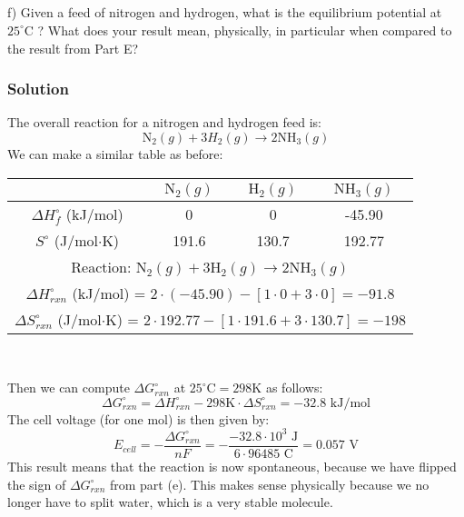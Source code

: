 \documentclass[12pt]{article}
\begin{document}
\subsection{}
f) Given a feed of nitrogen and hydrogen, what is the equilibrium potential at $25^{\circ} \mathrm{C}$ ? What does your result mean, physically, in particular when compared to the result from Part E?
\subsubsection{Solution}
The overall reaction for a nitrogen and hydrogen feed is:
\begin{equation}
\mathrm{N}_{2}(g) + 3 H_{2}(g) \rightarrow 2 \mathrm{NH}_{3}(g)
\end{equation}
We can make a similar table as before:
\begin{center}
\begin{tabular}{|c|c|c|c|}
\hline
    & $\mathrm{N_{2}}(g)$ & $\mathrm{H_{2}}(g)$ & $\mathrm{NH_{3}}(g)$ \\
\hline
$\Delta H_{f}^{\circ}$ (kJ/mol) & 0 & 0 & -45.90 \\
\hline
$S^{\circ}$ (J/mol$\cdot$K) & 191.6 & 130.7 & 192.77 \\
\hline
\multicolumn{4}{|c|}{Reaction: $\mathrm{N}_{2}(g) + 3 \mathrm{H_{2}}(g) \rightarrow 2 \mathrm{NH_{3}}(g)$} \\
\hline
\multicolumn{4}{|c|}{$\Delta H_{rxn}^{\circ}$ (kJ/mol) = $2 \cdot (-45.90) - [1 \cdot 0 + 3 \cdot 0] = -91.8 $} \\
\hline
\multicolumn{4}{|c|}{$\Delta S_{rxn}^{\circ}$ (J/mol$\cdot$K) = $2 \cdot 192.77 - [1 \cdot 191.6 + 3 \cdot 130.7] = -198$} \\
\hline
\end{tabular}\\
\end{center}
Then we can compute $\Delta G_{rxn}^{\circ}$ at $25^{\circ} \mathrm{C}=298 \mathrm{K}$ as follows:
\begin{equation}
\Delta G_{rxn}^{\circ} = \Delta H_{rxn}^{\circ} - 298 \mathrm{K} \cdot \Delta S_{rxn}^{\circ} = -32.8 \text{ kJ/mol}
\end{equation}
The cell voltage (for one mol) is then given by:
\begin{equation}E_{cell} = -\frac{\Delta G_{rxn}^{\circ}}{nF} = -\frac{-32.8 \cdot 10^{3} \text{ J}}{6 \cdot 96485 \text{ C}} = 0.057 \text{ V}
\end{equation}
This result means that the reaction is now spontaneous, because we have flipped the sign of $\Delta G_{rxn}^{\circ}$ from part (e). This makes sense physically because we no longer have to split water, which is a very stable molecule.
\end{document}
